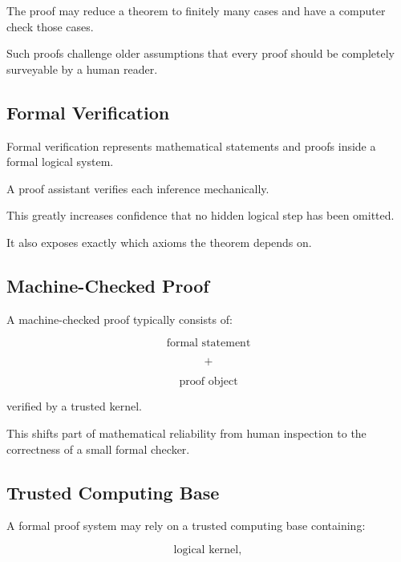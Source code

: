 The proof may reduce a theorem to finitely many cases and have a computer
check those cases.

Such proofs challenge older assumptions that every proof should be
completely surveyable by a human reader.

\subsection{Formal Verification}
\label{subsec:foundational-formal-verification}

Formal verification represents mathematical statements and proofs inside a
formal logical system.

A proof assistant verifies each inference mechanically.

This greatly increases confidence that no hidden logical step has been
omitted.

It also exposes exactly which axioms the theorem depends on.

\subsection{Machine-Checked Proof}
\label{subsec:machine-checked-proof}

A machine-checked proof typically consists of:

\[
\boxed{
\text{formal statement}
}
\]

\[
\boxed{
+
}
\]

\[
\boxed{
\text{proof object}
}
\]

verified by a trusted kernel.

This shifts part of mathematical reliability from human inspection to the
correctness of a small formal checker.

\subsection{Trusted Computing Base}
\label{subsec:trusted-computing-base}

A formal proof system may rely on a trusted computing base containing:

\[
\boxed{
\text{logical kernel},
}
\]

